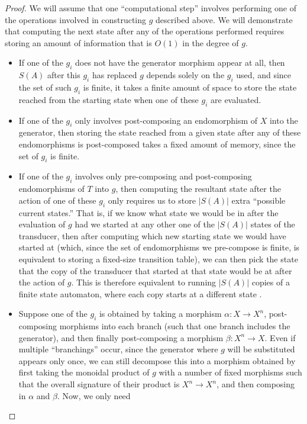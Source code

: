 \documentclass[10pt,a4paper]{amsart}
\begin{document}
\begin{proof}
We will assume that one ``computational step'' involves performing one
of the operations involved in constructing $g$ described above. We
will demonstrate that computing the next state after
any of the operations performed requires storing an amount of information
that is $O(1)$ in the degree of $g$.
\begin{itemize}
\item If one of the $g_i$ does not have the generator morphism appear
at all, then $S(A)$ after this $g_i$ has replaced $g$ depends solely
on the $g_i$ used, and since the set of such $g_i$ is finite, it takes
a finite amount of space to store the state reached from the starting
state when one of these $g_i$ are evaluated. 
\item If one of the $g_i$ only involves post-composing an endomorphism
of $X$ into the generator, then storing the state reached from a given
state after any of these endomorphisms is post-composed takes a fixed
amount of memory, since the set of $g_i$ is finite.
\item If one of the $g_i$ involves only pre-composing and post-composing
endomorphisms of $T$ into $g$, then computing the resultant state after
the action of one of these $g_i$ only requires us to store $|S(A)|$
extra ``possible current states.'' That is, if we know what state we
would be in after the evaluation of $g$ had we started at any other
one of the $|S(A)|$ states of the transducer, then after computing
which new starting state we would have started at (which, since the
set of endomorphisms we pre-compose is finite, is equivalent to storing
a fixed-size transition table), we can then pick
the state that the copy of the transducer that started at that state
would be at after the action of $g$. This is therefore equivalent
to running $|S(A)|$ copies of a finite state automaton, where each
copy starts at a different state .
\item Suppose one of the $g_i$ is obtained by taking a morphism
$\alpha:X\to X^n$, post-composing morphisms into each branch (such that
one branch includes the generator), and then finally post-composing
a morphism $\beta:X^n \to X$. Even if
multiple ``branchings'' occur, since the generator where $g$ will
be substituted appears only once, we can still decompose this
into a morphism obtained by
first taking the monoidal product of $g$ with a number of fixed
morphisms such that the overall signature of their product is
$X^n \to X^n$, and then composing in $\alpha$ and $\beta$.
Now, we only need

\end{itemize}
\end{proof}
\end{document}
